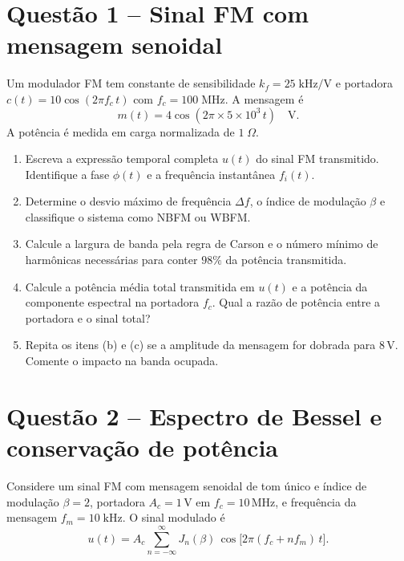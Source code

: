 \documentclass[11pt,a4paper]{article}
\begin{document}
\section*{Questão 1 -- Sinal FM com mensagem senoidal}

Um modulador FM tem constante de sensibilidade $k_f = 25\;\text{kHz/V}$ e portadora $c(t) = 10\cos(2\pi f_c\,t)$ com $f_c = 100\;\text{MHz}$. A mensagem é
\[
  m(t) = 4\cos(2\pi \times 5 \times 10^3\,t)\quad\text{V}.
\]
A potência é medida em carga normalizada de $1\;\Omega$.

\begin{enumerate}[label=\alph*)]
  \item Escreva a expressão temporal completa $u(t)$ do sinal FM transmitido. Identifique a fase $\phi(t)$ e a frequência instantânea $f_i(t)$.
  \item Determine o desvio máximo de frequência $\Delta f$, o índice de modulação $\beta$ e classifique o sistema como NBFM ou WBFM.
  \item Calcule a largura de banda pela regra de Carson e o número mínimo de harmônicas necessárias para conter $98\%$ da potência transmitida.
  \item Calcule a potência média total transmitida em $u(t)$ e a potência da componente espectral na portadora $f_c$. Qual a razão de potência entre a portadora e o sinal total?
  \item Repita os itens (b) e (c) se a amplitude da mensagem for dobrada para $8$\,V. Comente o impacto na banda ocupada.
\end{enumerate}

\section*{Questão 2 -- Espectro de Bessel e conservação de potência}

Considere um sinal FM com mensagem senoidal de tom único e índice de modulação $\beta = 2$, portadora $A_c = 1$\,V em $f_c = 10$\,MHz, e frequência da mensagem $f_m = 10\;\text{kHz}$. O sinal modulado é
\[
  u(t) = A_c \sum_{n=-\infty}^{\infty} J_n(\beta)\,\cos\!\big[2\pi(f_c + n f_m)\,t\big].
\]
\end{document}
